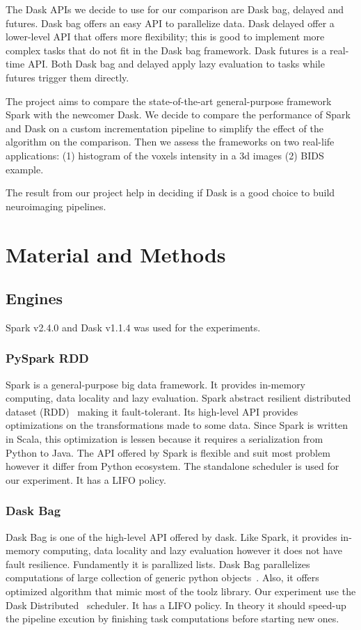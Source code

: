 \documentclass[conference]{IEEEtran}
\begin{document}
The Dask APIs we decide to use for our comparison are Dask bag, delayed and futures.
Dask bag offers an easy API to parallelize data. Dask delayed offer a lower-level API
that offers more flexibility; this is good to implement more complex tasks that do
not fit in the Dask bag framework. Dask futures is a real-time API. Both Dask bag and
delayed apply lazy evaluation to tasks while futures trigger them directly.

The project aims to compare the state-of-the-art general-purpose framework Spark with
the newcomer Dask. We decide to compare the performance of Spark and Dask on a custom
incrementation pipeline to simplify the effect of the algorithm on the comparison.
Then we assess the frameworks on two real-life applications: (1) histogram of the
voxels intensity in a 3d images (2) BIDS example.

The result from our project help in deciding if Dask is a good choice to build
neuroimaging pipelines.


\section{Material and Methods}

\subsection{Engines}
Spark v2.4.0 and Dask v1.1.4 was used for the experiments.

\subsubsection{PySpark RDD~\cite{spark-rdd}} Spark is a general-purpose big data
framework. It provides in-memory computing, data locality and lazy evaluation. Spark
abstract resilient distributed dataset (RDD)~\cite{RDD} making it fault-tolerant. Its
high-level API provides optimizations on the transformations made to some data. Since
Spark is written in Scala, this optimization is lessen because it requires a
serialization from Python to Java. The API offered by Spark is flexible and suit most
problem however it differ from Python ecosystem. The standalone scheduler is used for
our experiment. It has a LIFO policy.

\subsubsection{Dask Bag~\cite{dask-bag}} Dask Bag is one of the high-level API
offered by dask. Like Spark, it provides in-memory computing, data locality and lazy
evaluation however it does not have fault resilience. Fundamently it is parallized
lists. Dask Bag parallelizes computations of large collection of generic python
objects~\cite{dask-bag}. Also, it offers optimized algorithm that mimic most of the
toolz library. Our experiment use the Dask Distributed~\cite{dask-distributed}
scheduler. It has a LIFO policy. In theory it should speed-up the pipeline excution
by finishing task computations before starting new ones.
\end{document}
